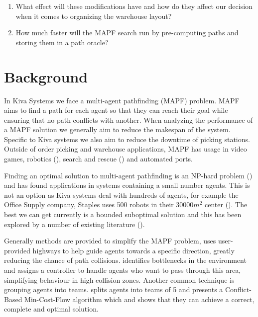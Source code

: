 \documentclass[a4paper,11pt]{article}
\begin{document}
\begin{enumerate}
	\item What effect will these modifications have and how do they affect our decision when it comes to organizing the warehouse layout?

\item How much faster will the MAPF search run by pre-computing paths and storing them in a path oracle?

\end{enumerate}

\section{Background}
\label{background}

In Kiva Systems we face a multi-agent pathfinding (MAPF) problem. MAPF aims to find a path for each agent so that they can reach their goal while ensuring that no path conflicts with another. When analyzing the performance of a MAPF solution we generally aim to reduce the makespan of the system. Specific to Kiva systems we also aim to reduce the downtime of picking stations. Outside of order picking and warehouse applications,  MAPF has usage in video games, robotics (\cite{bennewitz2002finding}), search and rescue (\cite{konolige2006centibots}) and automated ports.

Finding an optimal solution to multi-agent pathfinding is an NP-hard problem (\cite{yu2013structure}) and has found applications in systems containing a small number agents. This is not an option as Kiva systems deal with hundreds of agents, for example the Office Supply company, Staples uses 500 robots in their $30000m^{2}$ center (\cite{guizzo2008three}). The best we can get currently is a bounded suboptimal solution and this has been explored by a number of existing literature (\cite{cohen2016bounded}).

Generally methods are provided to simplify the MAPF problem, \cite{cohen2016bounded} uses user-provided highways to help guide agents towards a specific direction, greatly reducing the chance of path collisions. \cite{wilt2014spatially} identifies bottlenecks in the environment and assigns a controller to handle agents who want to pass through this area, simplifying behaviour in high collision zones. Another common technique is grouping agents into teams. \cite{ma2016optimal} splits agents into teams of 5 and presents a Conflict-Based Min-Cost-Flow algorithm which and shows that they can achieve a correct, complete and optimal solution.
\end{document}
